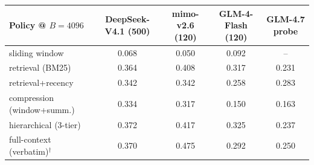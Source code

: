 \begin{tabular}{lcccc}
\toprule
Policy @ $B{=}4096$ & DeepSeek-V4.1 (500) & mimo-v2.6 (120) & GLM-4-Flash (120) & GLM-4.7 probe \\
\midrule
sliding window & 0.068 & 0.050 & 0.092 & -- \\
retrieval (BM25) & 0.364 & 0.408 & 0.317 & 0.231 \\
retrieval+recency & 0.342 & 0.342 & 0.258 & 0.283 \\
compression (window+summ.) & 0.334 & 0.317 & 0.150 & 0.163 \\
hierarchical (3-tier) & 0.372 & 0.417 & 0.325 & 0.237 \\
\midrule
full-context (verbatim)$^{\dagger}$ & 0.370 & 0.475 & 0.292 & 0.250 \\
\bottomrule
\end{tabular}
